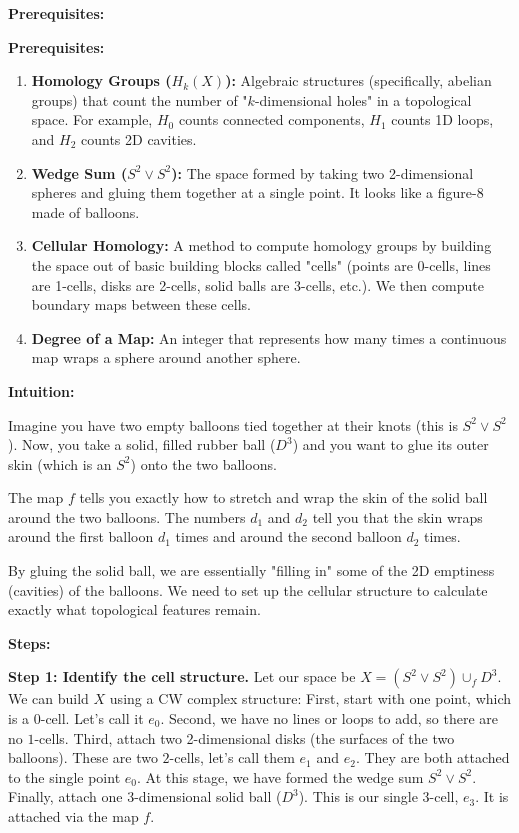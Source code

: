 \begin{solution}
\textbf{Prerequisites:}

\textbf{Prerequisites:}
\begin{enumerate}
    \item \textbf{Homology Groups ($H_k(X)$):} Algebraic structures (specifically, abelian groups) that count the number of "$k$-dimensional holes" in a topological space. For example, $H_0$ counts connected components, $H_1$ counts 1D loops, and $H_2$ counts 2D cavities.
    \item \textbf{Wedge Sum ($S^2 \vee S^2$):} The space formed by taking two 2-dimensional spheres and gluing them together at a single point. It looks like a figure-8 made of balloons.
    \item \textbf{Cellular Homology:} A method to compute homology groups by building the space out of basic building blocks called "cells" (points are 0-cells, lines are 1-cells, disks are 2-cells, solid balls are 3-cells, etc.). We then compute boundary maps between these cells.
    \item \textbf{Degree of a Map:} An integer that represents how many times a continuous map wraps a sphere around another sphere.
\end{enumerate}

\textbf{Intuition:}

Imagine you have two empty balloons tied together at their knots (this is $S^2 \vee S^2$). Now, you take a solid, filled rubber ball ($D^3$) and you want to glue its outer skin (which is an $S^2$) onto the two balloons.

The map $f$ tells you exactly how to stretch and wrap the skin of the solid ball around the two balloons. The numbers $d_1$ and $d_2$ tell you that the skin wraps around the first balloon $d_1$ times and around the second balloon $d_2$ times.

By gluing the solid ball, we are essentially "filling in" some of the 2D emptiness (cavities) of the balloons. We need to set up the cellular structure to calculate exactly what topological features remain.

\textbf{Steps:}

\textbf{Step 1: Identify the cell structure.}
Let our space be $X = (S^2 \vee S^2) \cup_f D^3$. We can build $X$ using a CW complex structure:
First, start with one point, which is a $0$-cell. Let's call it $e_0$.
Second, we have no lines or loops to add, so there are no $1$-cells.
Third, attach two 2-dimensional disks (the surfaces of the two balloons). These are two $2$-cells, let's call them $e_1$ and $e_2$. They are both attached to the single point $e_0$. At this stage, we have formed the wedge sum $S^2 \vee S^2$.
Finally, attach one 3-dimensional solid ball ($D^3$). This is our single $3$-cell, $e_3$. It is attached via the map $f$.


\end{solution}
